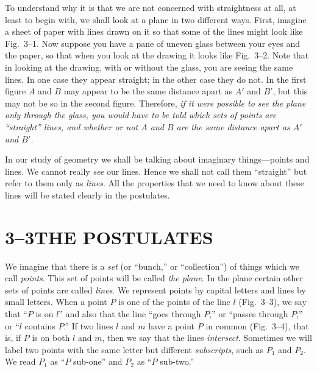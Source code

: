 \documentclass[11pt]{book}
\theoremstyle{bkplain}
\theoremstyle{XIplainnote}
\theoremstyle{bkplain}
\theoremstyle{bkplain}
\begin{document}
To understand why it is that we are not concerned with straightness at all, at
least to begin with, we shall look at a plane in two different ways. First,
imagine a sheet of paper with lines drawn on it so that some of the lines might
look like Fig.~3--1. Now suppose you have a pane of uneven glass between your
eyes and the paper, so that when you look at the drawing it looks like
Fig.~3--2. Note that in looking at the drawing, with or without the glass, you
are seeing the same lines. In one case they appear straight; in the other case
they do not. In the first figure $A$ and $B$ may appear to be the same distance
apart as $A'$ and $B'$, but this may not be so in the second figure. Therefore,
\emph{if it were possible to see the plane only through the glass, you would have
to be told which sets of points are ``straight'' lines, and whether or not $A$
and $B$ are the same distance apart as $A'$ and $B'$.}

\FIGIIIONETWO

In our study of geometry we shall be talking about imaginary things---points and
lines. We cannot really \emph{see} our lines. Hence we shall not call them
``straight'' but refer to them only as \emph{lines}. All the properties that we
need to know about these lines will be stated clearly in the postulates.

\section*{3--3\quad THE POSTULATES}

We imagine that there is a \emph{set} (or ``bunch,'' or ``collection'') of things
which we call \emph{points}. This set of points will be called \emph{the plane}.
In the plane certain other sets of points are called \emph{lines}. We represent
points by capital letters and lines by small letters. When a point $P$ is one of
the points of the line $l$ (Fig.~3--3), we say that ``$P$ is on $l$'' and also
that the line ``goes through $P$,'' or ``passes through $P$,'' or ``$l$ contains
$P$.'' If two lines $l$ and $m$ have a point $P$ in common (Fig.~3--4), that is,
if $P$ is on both $l$ and $m$, then we say that the lines \emph{intersect}.
Sometimes we will label two points with the same letter but different
\emph{subscripts}, such as $P_1$ and $P_2$. We read $P_1$ as ``$P$ sub-one'' and
$P_2$ as ``$P$ sub-two.''

\FIGIIITHREEFOURFIVE
\end{document}
